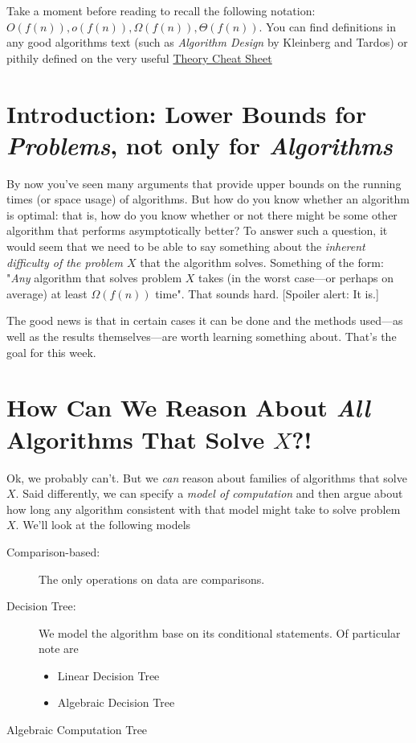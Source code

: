 \documentclass[11pt]{article}
\begin{document}
Take a moment before reading to recall the following notation: $O(f(n)), o(f(n)), \Omega(f(n)), \Theta(f(n))$.
You can find definitions in any good algorithms text (such as {\it Algorithm Design} by Kleinberg and Tardos) or pithily defined on the very useful
\href{resources/Theory_Cheat_Sheet.pdf}{Theory Cheat Sheet }

\section{Introduction: Lower Bounds for {\it Problems}, not only for {\it Algorithms}}
By now you've seen many arguments that provide upper bounds on the running times (or space usage) of algorithms. But how do you know whether an algorithm is optimal: that is, how do you know whether or not there might be some other algorithm that performs asymptotically better?  To answer such a question, it would seem that we need to be able to say something about the {\em inherent difficulty of the problem $X$} that the algorithm solves.  Something of the form: "{\em Any} algorithm that solves problem $X$ takes (in the worst case---or perhaps on average) at least $\Omega(f(n))$ time".
That sounds hard. [Spoiler alert: It is.]

The good news is that in certain cases it can be done and the methods used---as well as the results themselves---are worth learning something about.  That's the goal for this week.

\section{How Can We Reason About {\em All} Algorithms That Solve $X$?!}
Ok, we probably can't.  But we {\em can} reason about families of algorithms that solve $X$. Said differently, we can specify a {\em model of computation} and then argue about how long any algorithm consistent with that model might take to solve problem $X$.  We'll look at the following models
\begin{description}
\item[Comparison-based:] The only operations on data are comparisons.
\item[Decision Tree:]  We model the algorithm base on its conditional statements.  Of particular note are
\begin{itemize}
\item Linear Decision Tree
\item Algebraic Decision Tree
\end{itemize}
\item[Algebraic Computation Tree]
\end{description}
\end{document}
